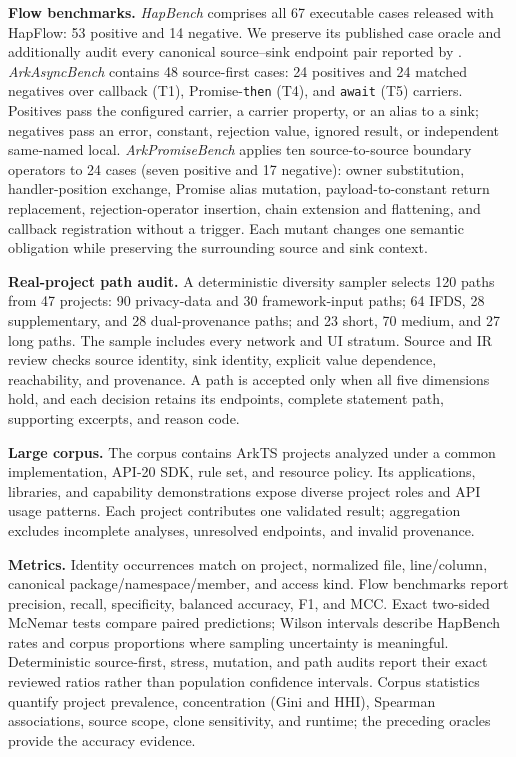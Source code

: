 \textbf{Flow benchmarks.}
\emph{HapBench} comprises all 67 executable cases released with HapFlow: 53 positive and 14 negative. We preserve its published case oracle and additionally audit every canonical source--sink endpoint pair reported by \mytool. \emph{ArkAsyncBench} contains 48 source-first cases: 24 positives and 24 matched negatives over callback (T1), Promise-\texttt{then} (T4), and \texttt{await} (T5) carriers. Positives pass the configured carrier, a carrier property, or an alias to a sink; negatives pass an error, constant, rejection value, ignored result, or independent same-named local. \emph{ArkPromiseBench} applies ten source-to-source boundary operators to 24 cases (seven positive and 17 negative): owner substitution, handler-position exchange, Promise alias mutation, payload-to-constant return replacement, rejection-operator insertion, chain extension and flattening, and callback registration without a trigger. Each mutant changes one semantic obligation while preserving the surrounding source and sink context.

\textbf{Real-project path audit.}
A deterministic diversity sampler selects 120 paths from 47 projects: 90 privacy-data and 30 framework-input paths; 64 IFDS, 28 supplementary, and 28 dual-provenance paths; and 23 short, 70 medium, and 27 long paths. The sample includes every network and UI stratum. Source and IR review checks source identity, sink identity, explicit value dependence, reachability, and provenance. A path is accepted only when all five dimensions hold, and each decision retains its endpoints, complete statement path, supporting excerpts, and reason code.

\textbf{Large corpus.}
The corpus contains \CorpusProjects{} ArkTS projects analyzed under a common implementation, API-20 SDK, rule set, and resource policy. Its applications, libraries, and capability demonstrations expose diverse project roles and API usage patterns. Each project contributes one validated result; aggregation excludes incomplete analyses, unresolved endpoints, and invalid provenance.

\textbf{Metrics.}
Identity occurrences match on project, normalized file, line/column, canonical package/namespace/member, and access kind. Flow benchmarks report precision, recall, specificity, balanced accuracy, F1, and MCC. Exact two-sided McNemar tests compare paired predictions; Wilson intervals describe HapBench rates and corpus proportions where sampling uncertainty is meaningful. Deterministic source-first, stress, mutation, and path audits report their exact reviewed ratios rather than population confidence intervals. Corpus statistics quantify project prevalence, concentration (Gini and HHI), Spearman associations, source scope, clone sensitivity, and runtime; the preceding oracles provide the accuracy evidence.

